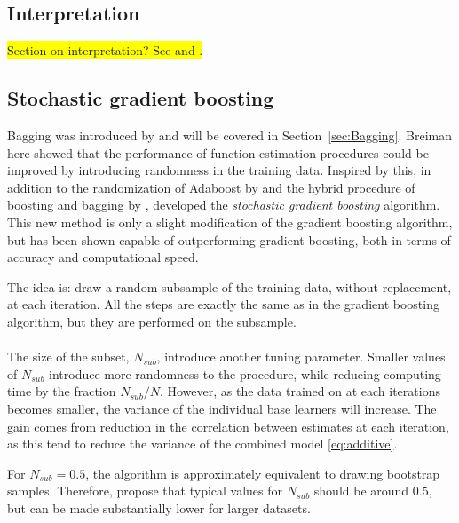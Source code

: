 \subsection{Interpretation}
\label{sub:Interpretation}
\colorbox{yellow}{Section on interpretation? See \cite[10.3]{modstat} and \cite{friedman}.}

\subsection{Stochastic gradient boosting}
\label{sub:Stochastic gradient boosting}
Bagging was introduced by \cite{Breiman1996} and will be covered in Section~\ref{sec:Bagging}. Breiman here showed that the performance of function estimation procedures could be improved by introducing randomness in the training data. 
Inspired by this, in addition to the randomization of Adaboost by \cite{freund1996} and the hybrid procedure of boosting and bagging by \cite{breiman1999}, \cite{FriedmanStochBoost} developed the \textit{stochastic gradient boosting} algorithm.
This new method is only a slight modification of the gradient boosting algorithm, but has been shown capable of outperforming gradient boosting, both in terms of accuracy and computational speed.  

The idea is: draw a random subsample of the training data, without replacement, at each iteration. All the steps are exactly the same as in the gradient boosting algorithm, but they are performed on the subsample. \\
\\
The size of the subset, $N_{sub}$, introduce another tuning parameter. Smaller values of $N_{sub}$ introduce more randomness to the procedure, while reducing computing time by the fraction $N_{sub}/N$. However, as the data trained on at each iterations becomes smaller, the variance of the individual base learners will increase. The gain comes from reduction in the correlation between estimates at each iteration, as this tend to reduce the variance of the combined model \eqref{eq:additive}.

For $N_{sub} = 0.5$, the algorithm is approximately equivalent to drawing bootstrap samples. Therefore, \cite{modstat} propose that typical values for $N_{sub}$ should be around $0.5$, but can be made substantially lower for larger datasets.

